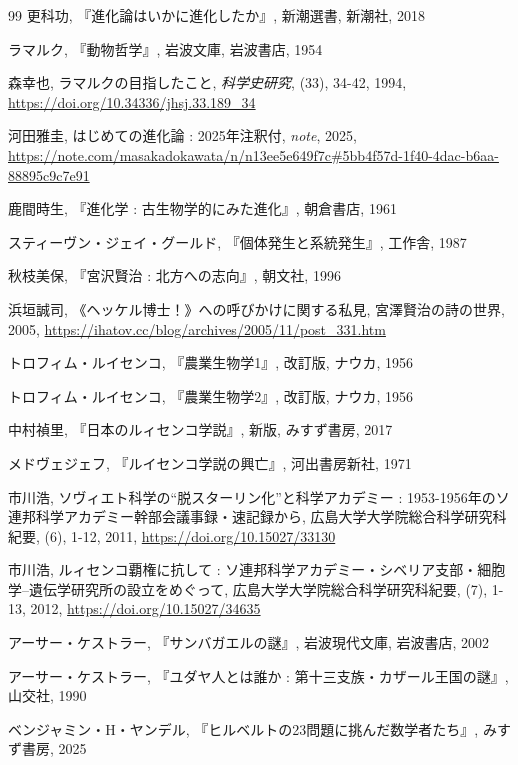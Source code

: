 \documentclass[10pt, a5paper, twoside]{ltjsarticle}
\newcommand{\hyphen}{\insertkanjiskip--\insertkanjiskip}
\begin{document}
\begin{thebibliography}{99}
         更科功, 『進化論はいかに進化したか』, 新潮選書, 新潮社, 2018

         ラマルク, 『動物哲学』, 岩波文庫, 岩波書店, 1954

         森幸也, ラマルクの目指したこと, \textit{科学史研究}, (33), 34-42, 1994, \url{https://doi.org/10.34336/jhsj.33.189_34}

         河田雅圭, はじめての進化論 : 2025年注釈付, \textit{note}, 2025, \url{https://note.com/masakadokawata/n/n13ee5e649f7c#5bb4f57d-1f40-4dac-b6aa-88895c9c7e91}

         鹿間時生, 『進化学 : 古生物学的にみた進化』, 朝倉書店, 1961

         スティーヴン・ジェイ・グールド, 『個体発生と系統発生』, 工作舎, 1987

         秋枝美保, 『宮沢賢治 : 北方への志向』, 朝文社, 1996

         浜垣誠司, 《ヘッケル博士！》への呼びかけに関する私見, 宮澤賢治の詩の世界, 2005, \url{https://ihatov.cc/blog/archives/2005/11/post_331.htm}

         トロフィム・ルイセンコ, 『農業生物学1』, 改訂版, ナウカ, 1956

         トロフィム・ルイセンコ, 『農業生物学2』, 改訂版, ナウカ, 1956

         中村禎里, 『日本のルィセンコ学説』, 新版, みすず書房, 2017

         メドヴェジェフ, 『ルイセンコ学説の興亡』, 河出書房新社, 1971

         市川浩, ソヴィエト科学の“脱スターリン化”と科学アカデミー : 1953-1956年のソ連邦科学アカデミー幹部会議事録・速記録から, 広島大学大学院総合科学研究科紀要, (6), 1-12, 2011, \url{https://doi.org/10.15027/33130}

         市川浩, ルィセンコ覇権に抗して : ソ連邦科学アカデミー・シベリア支部・細胞学\hyphen 遺伝学研究所の設立をめぐって, 広島大学大学院総合科学研究科紀要, (7), 1-13, 2012, \url{https://doi.org/10.15027/34635}

         アーサー・ケストラー, 『サンバガエルの謎』, 岩波現代文庫, 岩波書店, 2002

         アーサー・ケストラー, 『ユダヤ人とは誰か : 第十三支族・カザール王国の謎』, 山交社, 1990

         ベンジャミン・H・ヤンデル, 『ヒルベルトの23問題に挑んだ数学者たち』, みすず書房, 2025


\end{thebibliography}
\end{document}
